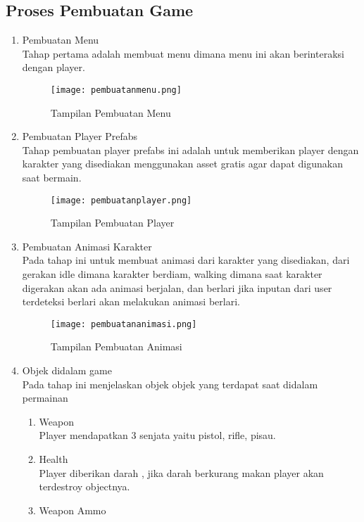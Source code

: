 \subsection{Proses Pembuatan Game}
\begin{enumerate}
    \item Pembuatan Menu\\
    Tahap pertama adalah membuat menu dimana menu ini akan berinteraksi dengan player.
    \begin{figure}[h]
        \centering
        \texttt{[image: pembuatanmenu.png]}
        \caption{Tampilan Pembuatan Menu}
        \label{fig:pembuatanmenu}
    \end{figure}
    \item Pembuatan Player Prefabs \\
    Tahap pembuatan player prefabs ini adalah untuk memberikan player dengan karakter yang disediakan menggunakan asset gratis agar dapat digunakan saat bermain.
    \newpage
    \begin{figure}[h]
        \centering
        \texttt{[image: pembuatanplayer.png]}
        \caption{Tampilan Pembuatan Player}
        \label{fig:pembuatanplayer}
    \end{figure}
    \item Pembuatan Animasi Karakter \\
    Pada tahap ini untuk membuat animasi dari karakter yang disediakan, dari gerakan idle dimana karakter berdiam, walking dimana saat karakter digerakan akan ada animasi berjalan, dan berlari jika inputan dari user terdeteksi berlari akan melakukan animasi berlari.
    \begin{figure}[h]
        \centering
        \texttt{[image: pembuatananimasi.png]}
        \caption{Tampilan Pembuatan Animasi}
        \label{fig:pembuatananimasi}
    \end{figure}
    \item Objek didalam game \\ 
    Pada tahap ini menjelaskan objek objek yang terdapat saat didalam permainan
    \begin{enumerate}
        \item Weapon\\
        Player mendapatkan 3 senjata yaitu pistol, rifle, pisau.
        \item Health \\
        Player diberikan darah , jika darah berkurang makan player akan terdestroy objectnya.
        \item Weapon Ammo \\

\end{enumerate}
\end{enumerate}

